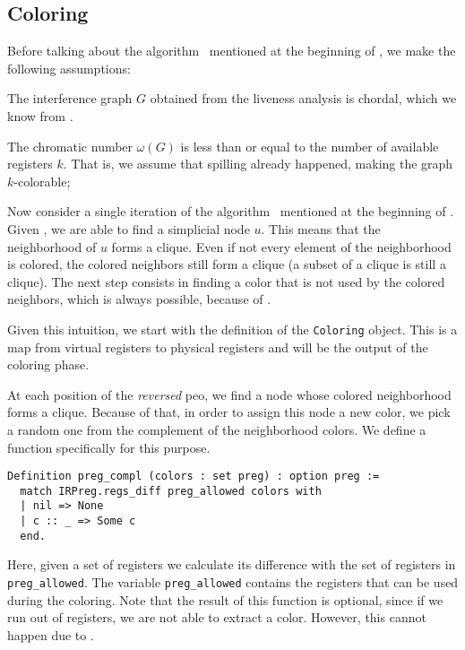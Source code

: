 \subsection{Coloring}
\label{subsec:coloring}

Before talking about the algorithm~\cite{HGG:2006:RA-SSA} mentioned at the beginning of , we make the following assumptions:

\begin{assumption}\label{ass:ig1}
The interference graph $G$ obtained from the liveness analysis is chordal, which we know from .
\end{assumption}

\begin{assumption}\label{ass:ig2}
The chromatic number $\omega(G)$ is less than or equal to the number of available registers $k$. That is, we assume that spilling already happened, making the graph $k$-colorable;
\end{assumption}

Now consider a single iteration of the algorithm~\cite{HGG:2006:RA-SSA} mentioned at the beginning of . Given , we are able to find a simplicial node $u$. This means that the neighborhood of $u$ forms a clique. Even if not every element of the neighborhood is colored, the colored neighbors still form a clique (a subset of a clique is still a clique). The next step consists in finding a color that is not used by the colored neighbors, which is always possible, because of .

Given this intuition, we start with the definition of the \texttt{Coloring} object. This is a map from virtual registers to physical registers and will be the output of the coloring phase.

At each position of the \textit{reversed} \gls{peo}, we find a node whose colored neighborhood forms a clique. Because of that, in order to assign this node a new color, we pick a random one from the complement of the neighborhood colors. We define a function specifically for this purpose.

\begin{lstlisting}[style=Rocq]
Definition preg_compl (colors : set preg) : option preg :=
  match IRPreg.regs_diff preg_allowed colors with
  | nil => None
  | c :: _ => Some c
  end.
\end{lstlisting}

Here, given a set of registers we calculate its difference with the set of registers in \texttt{preg\_allowed}. The variable \texttt{preg\_allowed} contains the registers that can be used during the coloring. Note that the result of this function is optional, since if we run out of registers, we are not able to extract a color. However, this cannot happen due to .


